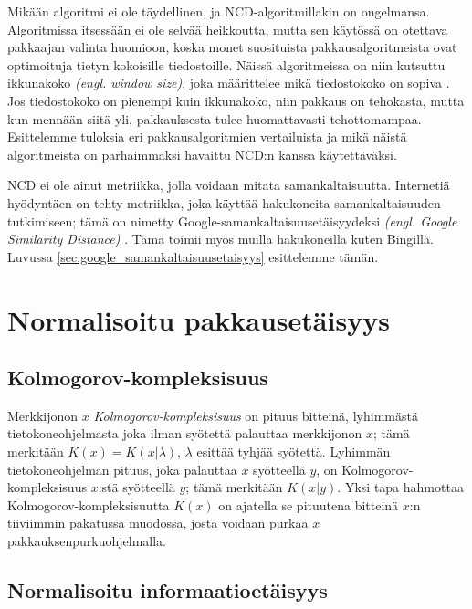 \documentclass[12pt,finnish]{tktltiki2}
\theoremstyle{definition}
\theoremstyle{remark}
\newcommand{\engl}[1]{\emph{(engl. #1)}}
\newcommand{\kolmogorov}{Kolmogorov-kompleksisuus}
\begin{document}
  Mikään algoritmi ei ole täydellinen, ja NCD-algoritmillakin on ongelmansa.
  Algoritmissa itsessään ei ole selvää heikkoutta, mutta sen käytössä on otettava pakkaajan valinta huomioon, koska monet suosituista pakkausalgoritmeista ovat optimoituja tietyn kokoisille tiedostoille.
  Näissä algoritmeissa on niin kutsuttu ikkunakoko \engl{window size}, joka määrittelee mikä tiedostokoko on sopiva \cite{cebrian2005common}.
  Jos tiedostokoko on pienempi kuin ikkunakoko, niin pakkaus on tehokasta, mutta kun mennään siitä yli, pakkauksesta tulee huomattavasti tehottomampaa.
  Esittelemme tuloksia eri pakkausalgoritmien vertailuista ja mikä näistä algoritmeista on parhaimmaksi havaittu NCD:n kanssa käytettäväksi.


\label{par:intro-5}
  NCD ei ole ainut metriikka, jolla voidaan mitata samankaltaisuutta.
  Internetiä hyödyntäen on tehty metriikka, joka käyttää hakukoneita samankaltaisuuden tutkimiseen; tämä on nimetty Google-samankaltaisuusetäisyydeksi \engl{Google Similarity Distance} \cite{cilibrasi2007google}.
  Tämä toimii myös muilla hakukoneilla kuten Bingillä. Luvussa \ref{sec:google_samankaltaisuusetaisyys} esittelemme tämän.


\section{Normalisoitu pakkausetäisyys} %
\label{sec:normalisoitu_pakkausetaisyys}
  \subsection{\kolmogorov} %
\label{sub:kolmogorov_kompleksisuus}

  Merkkijonon $x$ \emph{\kolmogorov} on pituus bitteinä, lyhimmästä tietokoneohjelmasta joka ilman syötettä palauttaa merkkijonon $x$; tämä merkitään $K(x)=K(x|\lambda)$, $\lambda$ esittää tyhjää syötettä.
  Lyhimmän tietokoneohjelman pituus, joka palauttaa $x$ syötteellä $y$, on \kolmogorov{} $x$:stä syötteellä $y$; tämä merkitään $K(x|y)$.
  Yksi tapa hahmottaa Kolmogorov-kompleksisuutta $K(x)$ on ajatella se pituutena bitteinä $x$:n tiiviimmin pakatussa muodossa, josta voidaan purkaa $x$ pakkauksenpurkuohjelmalla.

\subsection{Normalisoitu informaatioetäisyys} %
\label{sub:normalisoitu_informaatioetaisyys}
\end{document}
